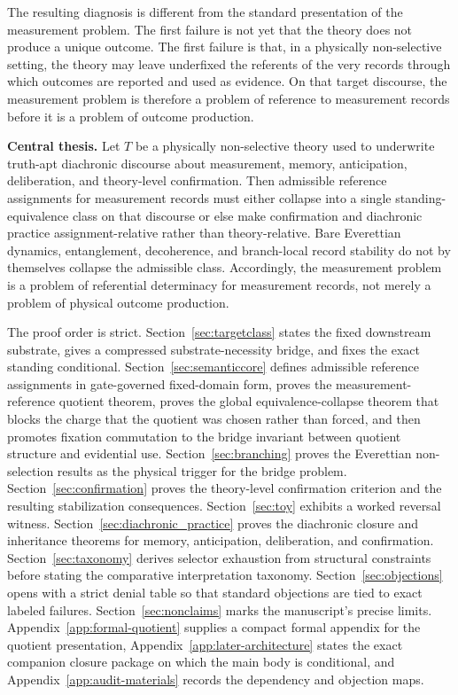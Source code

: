 The resulting diagnosis is different from the standard presentation of the measurement problem. The
first failure is not yet that the theory does not produce a unique outcome. The first failure is that, in a
physically non-selective setting, the theory may leave underfixed the referents of the very records
through which outcomes are reported and used as evidence. On that target discourse, the measurement
problem is therefore a problem of reference to measurement records before it is a problem of outcome
production.

\begin{claimbox}
\textbf{Central thesis.} Let $T$ be a physically non-selective theory used to underwrite truth-apt
diachronic discourse about measurement, memory, anticipation, deliberation, and theory-level
confirmation. Then admissible reference assignments for measurement records must either collapse into
a single standing-equivalence class on that discourse or else make confirmation and diachronic
practice assignment-relative rather than theory-relative. Bare Everettian dynamics, entanglement,
decoherence, and branch-local record stability do not by themselves collapse the admissible class.
Accordingly, the measurement problem is a problem of referential determinacy for measurement
records, not merely a problem of physical outcome production.
\end{claimbox}

The proof order is strict. Section~\ref{sec:targetclass} states the fixed downstream substrate, gives a
compressed substrate-necessity bridge, and fixes the exact standing conditional. Section~\ref{sec:semanticcore}
defines admissible reference assignments in gate-governed fixed-domain form, proves the
measurement-reference quotient theorem, proves the global equivalence-collapse theorem that blocks
the charge that the quotient was chosen rather than forced, and then promotes fixation commutation
to the bridge invariant between quotient structure and evidential use. Section~\ref{sec:branching}
proves the Everettian non-selection results as the physical trigger for the bridge problem.
Section~\ref{sec:confirmation} proves the theory-level confirmation criterion and the resulting
stabilization consequences. Section~\ref{sec:toy} exhibits a worked reversal witness.
Section~\ref{sec:diachronic_practice} proves the diachronic closure and inheritance theorems for
memory, anticipation, deliberation, and confirmation. Section~\ref{sec:taxonomy} derives selector
exhaustion from structural constraints before stating the comparative interpretation taxonomy.
Section~\ref{sec:objections} opens with a strict denial table so that standard objections are tied to
exact labeled failures.
Section~\ref{sec:nonclaims} marks the manuscript's precise limits. Appendix~\ref{app:formal-quotient}
supplies a compact formal appendix for the quotient presentation, Appendix~\ref{app:later-architecture}
states the exact companion closure package on which the main body is conditional, and
Appendix~\ref{app:audit-materials} records the dependency and objection maps.
